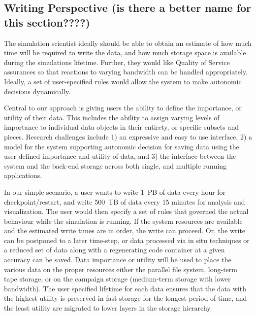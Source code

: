 \subsection{Writing Perspective (is there a better name for this section????)}
\label{subsec:sim-perspective}
The simulation scientist ideally should be able to
obtain an estimate of how much time will be required to write the data,
and how much storage space is available during the simulations lifetime.
Further, they would like Quality of Service assurances so that reactions
to varying bandwidth can be handled appropriately. Ideally, a set of
user-specified rules would allow the system to make autonomic decisions dynamically.
%

Central to our approach is giving users the ability to define the importance, or utility of their data.
This includes the ability to assign varying levels of importance to individual data objects in their entirety, or specific
subsets and pieces.
Research challenges include 1) an expressive and easy to use interface, 2) a model for the system supporting
autonomic decision for saving data using the user-defined importance and utility of data, and 3) the interface between
the system and the back-end storage across both single, and multiple running applications.

  In our simple scenario, a user wants to write 1~PB of data every hour
for checkpoint/restart, and write 500~TB of data every 15
minutes for analysis and visualization.
The user would then specify a set of rules that governed the actual behaviour while the simulation is running.
If the system resources are available and the estimated write times are in order, the write can proceed.
Or, the write can be postponed to a later time-step, or data processed via in situ techniques
or a reduced set of data along with a regenerating code container at a given accuracy can be saved.
Data importance or utility will be used to place the various data on the proper resources
either the parallel file system, long-term tape storage, or on the campaign storage (medium-term storage with lower bandwidth).
The user specified lifetime for each data ensures that the data with the highest utility is preserved in fast storage
for the longest period of time, and the least utility are migrated to lower layers in the storage hierarchy.


